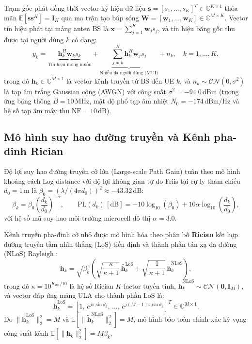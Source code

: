 \documentclass[12pt, a4paper]{article}
\begin{document}
Trạm gốc phát đồng thời vector ký hiệu dữ liệu $\mathbf{s} = [s_1, \dots, s_K]^T \in \mathbb{C}^{K \times 1}$ thỏa mãn $\mathbb{E}[\mathbf{s}\mathbf{s}^H] = \mathbf{I}_K$ qua ma trận tạo búp sóng $\mathbf{W} = [\mathbf{w}_1, \dots, \mathbf{w}_K] \in \mathbb{C}^{M \times K}$. Vector tín hiệu phát tại mảng anten BS là $\mathbf{x} = \sum_{j=1}^{K} \mathbf{w}_j s_j$, và tín hiệu băng gốc thu được tại người dùng $k$ có dạng:
\begin{equation}
    y_k = \underbrace{\mathbf{h}_k^H \mathbf{w}_k s_k}_{\text{Tín hiệu mong muốn}} + \underbrace{\sum_{j \neq k}^{K} \mathbf{h}_k^H \mathbf{w}_j s_j}_{\text{Nhiễu đa người dùng (MUI)}} + n_k, \quad k = 1, \dots, K,
\end{equation}
trong đó $\mathbf{h}_k \in \mathbb{C}^{M \times 1}$ là vector kênh truyền từ BS đến UE $k$, và $n_k \sim \mathcal{CN}(0, \sigma^2)$ là tạp âm trắng Gaussian cộng (AWGN) với công suất $\sigma^2 = -94.0\,\text{dBm}$ (tương ứng băng thông $B = 10\,\text{MHz}$, mật độ phổ tạp âm nhiệt $N_0 = -174\,\text{dBm/Hz}$ và hệ số tạp âm máy thu $\text{NF} = 10\,\text{dB}$).

\subsection{Mô hình suy hao đường truyền và Kênh pha-đinh Rician}
Độ lợi suy hao đường truyền cỡ lớn (Large-scale Path Gain) tuân theo mô hình khoảng cách Log-distance \cite{rappaport2002} với độ lợi không gian tự do Friis tại cự ly tham chiếu $d_0 = 1\,\text{m}$ là $\beta_0 = (\lambda / (4\pi d_0))^2 \approx -43.32\,\text{dB}$:
\begin{equation}
    \beta_k = \beta_0 \left(\frac{d_k}{d_0}\right)^{-\alpha}, \qquad \text{PL}(d_k)\,[\text{dB}] = -10\log_{10}(\beta_0) + 10\alpha \log_{10}\!\left(\frac{d_k}{d_0}\right),
\end{equation}
với hệ số mũ suy hao môi trường microcell đô thị $\alpha = 3.0$.

Kênh truyền pha-đinh cỡ nhỏ được mô hình hóa theo phân bố \textbf{Rician} kết hợp đường truyền tầm nhìn thẳng (LoS) tiền định và thành phần tán xạ đa đường (NLoS) Rayleigh \cite{rappaport2002, tse2005}:
\begin{equation}
    \mathbf{h}_k = \sqrt{\beta_k} \left( \sqrt{\frac{\kappa}{\kappa + 1}} \, \bar{\mathbf{h}}_k^{\text{LoS}} + \sqrt{\frac{1}{\kappa + 1}} \, \tilde{\mathbf{h}}_k^{\text{NLoS}} \right),
\end{equation}
trong đó $\kappa = 10^{K_{\text{dB}}/10}$ là hệ số Rician $K$-factor tuyến tính, $\tilde{\mathbf{h}}_k^{\text{NLoS}} \sim \mathcal{CN}(\mathbf{0}, \mathbf{I}_M)$, và vector đáp ứng mảng ULA cho thành phần LoS là:
\begin{equation}
    \bar{\mathbf{h}}_k^{\text{LoS}} = \left[1, \, e^{j\pi\sin\theta_k}, \, \dots, \, e^{j(M-1)\pi\sin\theta_k}\right]^T \in \mathbb{C}^{M \times 1}.
\end{equation}
Do $\|\bar{\mathbf{h}}_k^{\text{LoS}}\|_2^2 = M$ và $\mathbb{E}[\|\tilde{\mathbf{h}}_k^{\text{NLoS}}\|_2^2] = M$, mô hình bảo toàn chính xác kỳ vọng công suất kênh $\mathbb{E}[\|\mathbf{h}_k\|_2^2] = M\beta_k$.
\end{document}
